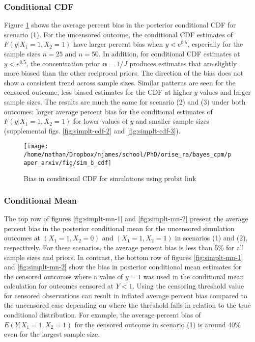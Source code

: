 \documentclass[
]{article}
\begin{document}
\hypertarget{conditional-cdf}{%
\subsubsection{Conditional CDF}\label{conditional-cdf}}

Figure \ref{fig:simplt-cdf-1} shows the average percent bias in the posterior conditional CDF for scenario (1). For the uncensored outcome, the conditional CDF estimates of \(F(y|X_1=1,X_2=1)\) have larger percent bias when \(y<e^{0.5}\), especially for the sample sizes \(n=25\) and \(n=50\). In addition, for conditional CDF estimates at \(y<e^{0.5}\), the concentration prior \(\boldsymbol{\alpha}=1/J\) produces estimates that are slightly more biased than the other reciprocal priors. The direction of the bias does not show a consistent trend across sample sizes. Similar patterns are seen for the censored outcome, less biased estimates for the CDF at higher \(y\) values and larger sample sizes. The results are much the same for scenario (2) and (3) under both outcomes: larger average percent bias for the conditional estimates of \(F(y|X_1=1,X_2=1)\) for lower values of \(y\) and smaller sample sizes (supplemental figs. \ref{fig:simplt-cdf-2} and \ref{fig:simplt-cdf-3}).

\begin{figure}

{\centering \texttt{[image: /home/nathan/Dropbox/njames/school/PhD/orise\_ra/bayes\_cpm/paper\_arxiv/fig/sim\_b\_cdf]} 

}

\caption{Bias in conditional CDF for simulations using probit link}\label{fig:simplt-cdf-1}
\end{figure}

\hypertarget{conditional-mean}{%
\subsubsection{Conditional Mean}\label{conditional-mean}}

The top row of figures \ref{fig:simplt-mn-1} and \ref{fig:simplt-mn-2} present the average percent bias in the posterior conditional mean for the uncensored simulation outcomes at \((X_1=1,X_2=0)\) and \((X_1=1,X_2=1)\) in scenarios (1) and (2), respectively. For these scenarios, the average percent bias is less than 5\% for all sample sizes and priors. In contrast, the bottom row of figures \ref{fig:simplt-mn-1} and \ref{fig:simplt-mn-2} show the bias in posterior conditional mean estimates for the censored outcomes where a value of \(y=1\) was used in the conditional mean calculation for outcomes censored at \(Y<1\). Using the censoring threshold value for censored observations can result in inflated average percent bias compared to the uncensored case depending on where the threshold falls in relation to the true conditional distribution. For example, the average percent bias of \(E(Y|X_1=1,X_2=1)\) for the censored outcome in scenario (1) is around 40\% even for the largest sample size.
\end{document}
